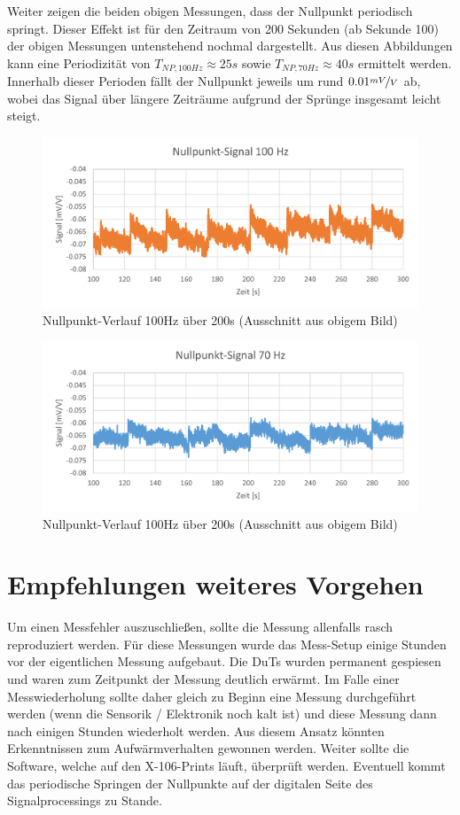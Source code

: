 Weiter zeigen die beiden obigen Messungen, dass der Nullpunkt periodisch springt. Dieser Effekt ist für den Zeitraum von 200 Sekunden (ab Sekunde 100) der obigen Messungen untenstehend nochmal dargestellt. Aus diesen Abbildungen kann eine Periodizität von $T_{NP, 100Hz} \approx 25s$ sowie $T_{NP, 70Hz} \approx 40s$ ermittelt werden. Innerhalb dieser Perioden fällt der Nullpunkt jeweils um rund $0.01 \nicefrac{mV}{V}$ ab, wobei das Signal über längere Zeiträume aufgrund der Sprünge insgesamt leicht steigt.
\begin{figure}[H]
	\centering
	\includegraphics[width=1\linewidth]{imgs/NP100_SHORT}
	\caption{Nullpunkt-Verlauf 100Hz über 200s (Ausschnitt aus obigem Bild)}
	\label{fig:np100short}
\end{figure}
\begin{figure}[H]
	\centering
	\includegraphics[width=1\linewidth]{imgs/NP70_SHORT}
	\caption{Nullpunkt-Verlauf 100Hz über 200s (Ausschnitt aus obigem Bild)}
	\label{fig:np70short}
\end{figure}
\section{Empfehlungen weiteres Vorgehen}
Um einen Messfehler auszuschließen, sollte die Messung allenfalls rasch reproduziert werden. Für diese Messungen wurde das Mess-Setup einige Stunden vor der eigentlichen Messung aufgebaut. Die  DuTs wurden permanent gespiesen und waren zum Zeitpunkt der Messung deutlich erwärmt. Im Falle einer Messwiederholung sollte daher gleich zu Beginn eine Messung durchgeführt werden (wenn die Sensorik / Elektronik noch kalt ist) und diese Messung dann nach einigen Stunden wiederholt werden. Aus diesem Ansatz könnten Erkenntnissen zum Aufwärmverhalten gewonnen werden. Weiter sollte die Software, welche auf den X-106-Prints läuft, überprüft werden. Eventuell kommt das periodische Springen der Nullpunkte auf der digitalen Seite des Signalprocessings zu Stande.
